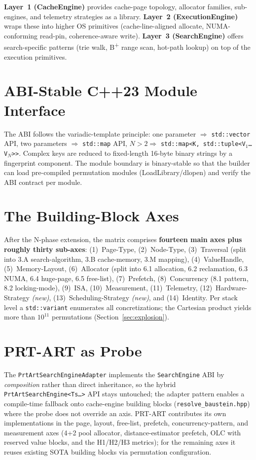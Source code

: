 \textbf{Layer~1 (CacheEngine)} provides cache-page topology, allocator families, sub-engines,
and telemetry strategies as a library. \textbf{Layer~2 (ExecutionEngine)} wraps these into
higher OS primitives (cache-line-aligned allocate, NUMA-conforming read-pin,
coherence-aware write). \textbf{Layer~3 (SearchEngine)} offers search-specific patterns
(trie walk, B\textsuperscript{+} range scan, hot-path lookup) on top of the execution
primitives.

\section{ABI-Stable C++23 Module Interface}\label{sec:abi}

The ABI follows the variadic-template principle: one parameter $\Rightarrow$
\texttt{std::vector} API, two parameters $\Rightarrow$ \texttt{std::map} API, $N>2
\Rightarrow$ \texttt{std::map<K,\,std::tuple<V$_1$\ldots V$_N$>>}. Complex keys are reduced
to fixed-length 16-byte binary strings by a fingerprint component. The module boundary is
binary-stable so that the builder can load pre-compiled permutation modules
(LoadLibrary/dlopen) and verify the ABI contract per module.

\section{The Building-Block Axes}\label{sec:axes}

After the N-phase extension, the
matrix comprises \textbf{fourteen main axes plus roughly thirty sub-axes}: (1)~Page-Type,
(2)~Node-Type, (3)~Traversal (split into 3.A search-algorithm, 3.B cache-memory, 3.M
mapping), (4)~ValueHandle, (5)~Memory-Layout, (6)~Allocator (split into 6.1 allocation,
6.2 reclamation, 6.3 NUMA, 6.4 huge-page, 6.5 free-list), (7)~Prefetch, (8)~Concurrency
(8.1 pattern, 8.2 locking-mode), (9)~ISA, (10)~Measurement, (11)~Telemetry, (12)~Hardware-Strategy
\emph{(new)}, (13)~Scheduling-Strategy \emph{(new)}, and (14)~Identity. Per stack level a
\texttt{std::variant} enumerates all concretizations; the Cartesian product yields more
than $10^{11}$ permutations (Section~\ref{sec:explosion}).

\section{PRT-ART as Probe}\label{sec:prt-art}

The \texttt{PrtArtSearchEngineAdapter} implements the \texttt{SearchEngine} ABI by
\emph{composition} rather than direct inheritance, so the hybrid
\texttt{PrtArtSearchEngine<Ts\ldots>} API stays untouched; the adapter pattern enables a
compile-time fallback onto cache-engine building blocks (\texttt{resolve\_baustein.hpp})
where the probe does not override an axis. PRT-ART contributes its own implementations in
the page, layout, free-list, prefetch, concurrency-pattern, and measurement axes
(4+2 pool allocator, distance-estimator prefetch, OLC with reserved value blocks, and the
H1/H2/H3 metrics); for the remaining axes it reuses existing SOTA building blocks via
permutation configuration.

